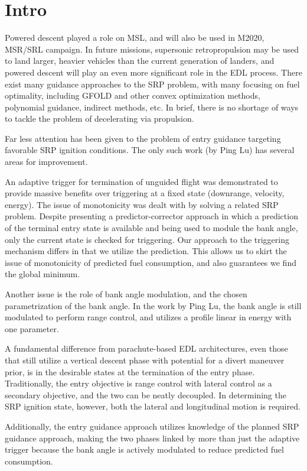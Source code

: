 \documentclass[]{article}
\begin{document}
\section{Intro}
Powered descent played a role on MSL, and will also be used in M2020, MSR/SRL campaign. In future missions, supersonic retropropulsion may be used to land larger, heavier vehicles than the current generation of landers, and powered descent will play an even more significant role in the EDL process. There exist many guidance approaches to the SRP problem, with many focusing on fuel optimality, including GFOLD and other convex optimization methods, polynomial guidance, indirect methods, etc. In brief, there is no shortage of ways to tackle the problem of decelerating via propulsion. 

Far less attention has been given to the problem of entry guidance targeting favorable SRP ignition conditions. The only such work (by Ping Lu) has several areas for improvement. 

An adaptive trigger for termination of unguided flight was demonstrated to provide massive benefits over triggering at a fixed state (downrange, velocity, energy). The issue of monotonicity was dealt with by solving a related SRP problem. Despite presenting a predictor-corrector approach in which a prediction of the terminal entry state is available and being used to module the bank angle, only the current state is checked for triggering. Our approach to the triggering mechanism differs in that we utilize the prediction. This allows us to skirt the issue of monotonicity of predicted fuel consumption, and also guarantees we find the global minimum. 

Another issue is the role of bank angle modulation, and the chosen parametrization of the bank angle. In the work by Ping Lu, the bank angle is still modulated to perform range control, and utilizes a profile linear in energy with one parameter. 

A fundamental difference from parachute-based EDL architectures, even those that still utilize a vertical descent phase with potential for a divert maneuver prior, is in the desirable states at the termination of the entry phase. Traditionally, the entry objective is range control with lateral control as a secondary objective, and the two can be neatly decoupled. In determining the SRP ignition state, however, both the lateral and longitudinal motion is required. 

Additionally, the entry guidance approach utilizes knowledge of the planned SRP guidance approach, making the two phases linked by more than just the adaptive trigger because the bank angle is actively modulated to reduce predicted fuel consumption. 
\end{document}
